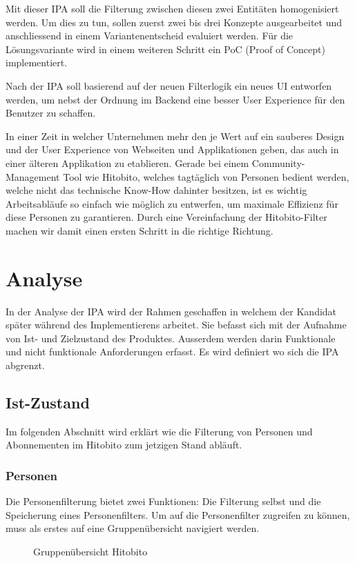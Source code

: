 Mit dieser IPA soll die Filterung zwischen diesen zwei Entitäten homogenisiert werden. Um dies zu tun,
sollen zuerst zwei bis drei Konzepte ausgearbeitet und anschliessend in einem Variantenentscheid evaluiert werden. Für die Lösungsvariante wird in einem weiteren Schritt ein PoC (Proof of Concept) implementiert. 

Nach der IPA soll basierend auf der neuen Filterlogik ein neues UI entworfen werden, um nebst der Ordnung im Backend
eine besser User Experience für den Benutzer zu schaffen.

In einer Zeit in welcher Unternehmen mehr den je Wert auf ein sauberes Design und der User Experience von Webseiten und Applikationen geben, das auch
in einer älteren Applikation zu etablieren. Gerade bei einem Community-Management Tool wie Hitobito, welches tagtäglich von 
Personen bedient werden, welche nicht das technische Know-How dahinter besitzen, ist es wichtig Arbeitsabläufe so einfach wie möglich zu entwerfen, um 
maximale Effizienz für diese Personen zu garantieren. Durch eine Vereinfachung der Hitobito-Filter machen wir damit einen ersten Schritt in die richtige
Richtung.

\chapter{Analyse}
In der Analyse der IPA wird der Rahmen geschaffen in welchem der Kandidat später während des Implementierens arbeitet. 
Sie befasst sich mit der Aufnahme von Ist- und Zielzustand des Produktes. Ausserdem werden darin Funktionale und nicht funktionale Anforderungen erfasst.
Es wird definiert wo sich die IPA abgrenzt. 

\section{Ist-Zustand}
Im folgenden Abschnitt wird erklärt wie die Filterung von Personen und Abonnementen im Hitobito zum
jetzigen Stand abläuft.

\subsection{Personen}
Die Personenfilterung bietet zwei Funktionen: Die Filterung selbst und die Speicherung eines Personenfilters.
Um auf die Personenfilter zugreifen zu können, muss als erstes auf eine Gruppenübersicht navigiert werden.

\begin{figure}[h]
   \centering
   \caption{Gruppenübersicht Hitobito}
\end{figure}

